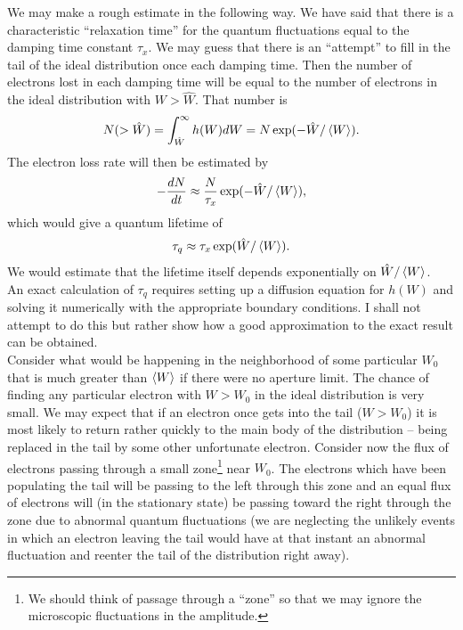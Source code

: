 We may make a rough estimate in the following way. We have said that there is a characteristic
 ``relaxation time'' for the quantum fluctuations equal to the damping time constant $\tau_x$. We may guess that there is an ``attempt'' to fill in the tail of the ideal distribution once each damping time. Then the number of electrons lost in each damping time will be equal to the number of electrons in the ideal distribution with $W > \hat{W}$. That number is
\begin{align}
	N(>\hat{W}) = \int_{\hat{W}}^\infty h(W) dW = N \exp(-\hat{W}/\left< W \right>).
\end{align}
The electron loss rate will then be estimated by
\begin{align}
	- \dfrac{dN}{dt} \approx \dfrac{N}{\tau_x} \exp(-\hat{W}/\left< W \right>),
\end{align}
which would give a quantum lifetime of
\begin{align}\label{eq:5.123}
	\tau_q \approx \tau_x \exp(\hat{W}/\left< W \right>).
\end{align}
We would estimate that the lifetime itself depends exponentially on $\hat{W}/\left< W \right>$.\\
An exact calculation of $\tau_q$ requires setting up a diffusion equation for $h(W)$ and solving it numerically with the appropriate boundary conditions. I shall not attempt to do this but rather show how a good approximation to the exact result can be obtained.\\
Consider what would be happening in the neighborhood of some particular $W_0$ that is much greater than $\left< W \right>$ if there were no aperture limit. The chance of finding any particular
 electron with $W > W_0$ in the ideal distribution is very small. We may expect that if an electron once gets into the tail ($W > W_0$) it is most likely to return rather quickly to the main body of the distribution -- being replaced in the tail by some other unfortunate electron. Consider now the flux of electrons passing through a small zone\footnote{We should think of passage through a ``zone'' so that we may ignore the microscopic fluctuations in the amplitude.} near $W_0$. The electrons which have been populating the tail will be passing to the left through this zone and an equal flux of electrons will (in the stationary state) be passing toward the right through the zone due to abnormal quantum fluctuations (we are neglecting the unlikely events in which an electron leaving the tail would have at that instant an abnormal fluctuation and reenter the tail of the distribution right away).\\
